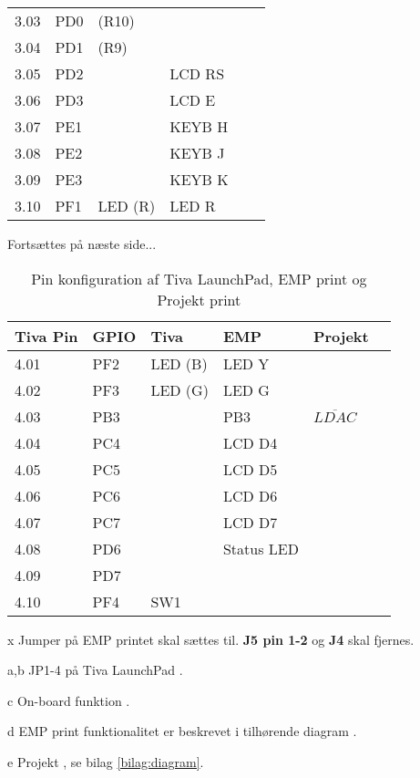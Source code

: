 \begin{table}[h!]
\begin{threeparttable}
\begin{tabular}{l l l l l l}
			3.03 & PD0	&(R10)	&				&								\\
			3.04 & PD1	&(R9)	&				&								\\
			3.05 & PD2	&		& LCD RS		& 				\\
			3.06 & PD3	&		& LCD E			& 						\\
			3.07 & PE1	&		& KEYB H		& 							\\
			3.08 & PE2	&		& KEYB J		&							\\
			3.09 & PE3	&		& KEYB K		&								\\
			3.10 & PF1	&LED (R)& LED R			&								\\
			\bottomrule
		\end{tabular}
	
		\begin{tablenotes}
			\item[] Fortsættes på næste side...
		\end{tablenotes}
	\end{threeparttable}
\end{table}
\newpage
\begin{table}[ht]
	\centering
	\caption{Pin konfiguration af Tiva LaunchPad, EMP print og Projekt print}
	\begin{threeparttable}
		\begin{tabular}{l l l l l l}
			\toprule
			\textbf{Tiva Pin\tnote{a}} 	& 
			\textbf{GPIO\tnote{b}}  	&
			\textbf{Tiva\tnote{c}} 		& 
			\textbf{EMP\tnote{d}}  		&
			\textbf{Projekt\tnote{e}} 	\\ 
			\midrule
			4.01 & PF2	&LED (B)& LED Y			&								\\
			4.02 & PF3	&LED (G)& LED G			&								\\
			4.03 & PB3	&		& PB3			&	$\overline{LDAC}$							\\
			4.04 & PC4	&		& LCD D4		& 			\\
			4.05 & PC5	&		& LCD D5		& 				\\
			4.06 & PC6	&		& LCD D6		& 				\\
			4.07 & PC7	&		& LCD D7		& 				\\
			4.08 & PD6	&		& Status LED	& 		\\
			4.09 & PD7	&		& 				&								\\
			4.10 & PF4	& SW1	& 				&								\\
			\bottomrule
		\end{tabular}
		
		\begin{tablenotes}
			\item[x] Jumper på EMP printet skal sættes til. \textbf{J5 pin 1-2} og \textbf{J4} skal fjernes.
			\item[a,b] JP1-4 på Tiva LaunchPad \cite[Afsnit 2.1.5 s. 9]{spmu296}.
			\item[c] On-board funktion \cite[Afsnit 2.1.5 s. 9]{spmu296}.
			\item[d] EMP print funktionalitet er beskrevet i tilhørende diagram \cite{emp-diagram}.
			\item[e] Projekt , se bilag \ref{bilag:diagram}.
		\end{tablenotes}
	\end{threeparttable}
\end{table}